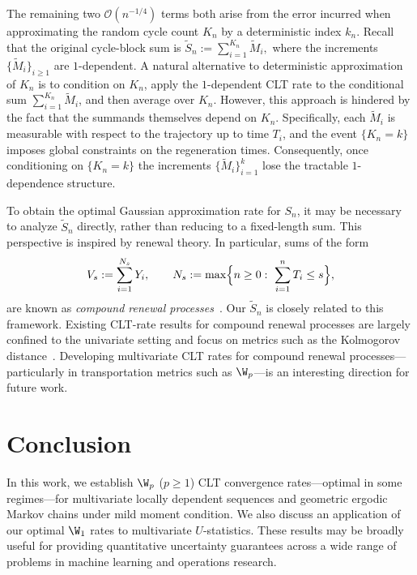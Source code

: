 \documentclass[mnsc,nonblindrev]{informs3}
\begin{document}
The remaining two $\mathcal O(n^{-1/4})$ terms both arise from the error incurred
when approximating the random cycle count $K_n$ by a deterministic index $k_n$. Recall that the
original cycle-block sum is $\widetilde S_n:=\sum_{i=1}^{K_n}\widetilde M_i,$ where the increments $\{\widetilde M_i\}_{i\ge1}$ are $1$-dependent. 
A natural alternative to deterministic approximation of $K_n$
is to condition on $K_n$, apply the $1$-dependent CLT rate to the
conditional sum $\sum_{i=1}^{K_n}\widetilde M_i$, and then average over $K_n$.
However, this approach is hindered by the fact that the summands themselves depend on $K_n$. Specifically,
each $\widetilde M_i$ is measurable with respect to the trajectory up to time
$T_i$, and the event $\{K_n=k\}$ imposes global constraints on the regeneration
times. Consequently, once conditioning on
$\{K_n=k\}$ the increments $\{\widetilde M_i\}_{i=1}^{k}$ lose the tractable
$1$-dependence structure. 

To obtain the optimal Gaussian approximation rate for $S_n$, it may be
necessary to analyze $\widetilde S_n$ directly, rather than reducing to a fixed-length
sum. This perspective is inspired by renewal theory. In particular, sums of the
form
\begin{equation*}
V_s:=\sum_{i=1}^{N_s} Y_i,
\qquad
N_s:=\max\Bigl\{n\ge 0:\ \sum_{i=1}^n T_i\le s\Bigr\},
\end{equation*}
are known as \emph{compound renewal processes}~\citep{cox1962renewal,cox2017theory,malinovskii2021level}. Our $\widetilde S_n$ is
closely related to this framework. Existing CLT-rate results for compound renewal processes are largely confined to
the univariate setting and focus on metrics such as the Kolmogorov distance~\citep{cox1962renewal,cox2017theory,malinovskii2021level}.
Developing
multivariate CLT rates for compound renewal processes---particularly in
transportation metrics such as $\W_p$---is an interesting direction for future
work.






















\section{Conclusion}\label{sec:conclusion}
In this work, we establish $\W_p$ ($p\ge 1$) CLT convergence rates---optimal in
some regimes---for multivariate locally dependent sequences and geometric ergodic Markov chains
under mild moment condition.
 We also
discuss an application of our optimal $\W_1$ rates to multivariate
$U$-statistics. These results may be broadly useful for providing quantitative
uncertainty guarantees across a wide range of problems in machine learning and operations research. 
\end{document}
